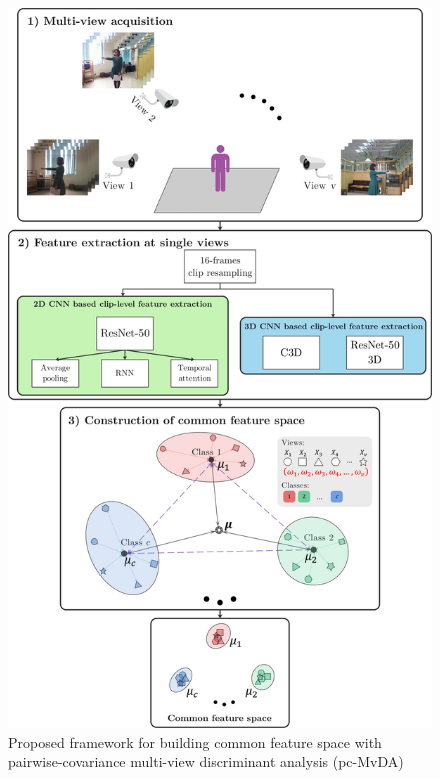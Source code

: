     \begin{figure}[htbp]
        \centering
        \includegraphics[width=0.82\linewidth]{Figs/Framework.png}
        \caption{Proposed framework for building common feature space with pairwise-covariance multi-view discriminant analysis (pc-MvDA)}
        \label{fig:frw}
    \end{figure}
